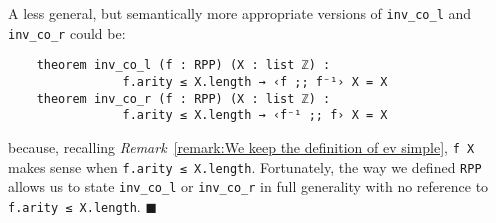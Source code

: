 \documentclass[runningheads]{llncs}
\newcommand*{\qeda}{\hfill\ensuremath{\blacksquare}}%
\begin{document}
\begin{remark}
\label{remark:On our simplifying choices on ev}
A less general, but semantically more appropriate versions of  \lstinline|inv_co_l| and \lstinline|inv_co_r| could be:
\begin{lstlisting}
    theorem inv_co_l (f : RPP) (X : list ℤ) :
                f.arity ≤ X.length → ‹f ;; f⁻¹› X = X
    theorem inv_co_r (f : RPP) (X : list ℤ) :
                f.arity ≤ X.length → ‹f⁻¹ ;; f› X = X
\end{lstlisting}
because, recalling \textit{Remark}~\ref{remark:We keep the definition of ev simple}, \lstinline|f X| makes sense when \lstinline|f.arity ≤ X.length|.
Fortunately, the way we defined \lstinline|RPP| allows us to state \lstinline|inv_co_l| or \lstinline|inv_co_r| in full generality
with no reference to \lstinline|f.arity ≤ X.length|.
\qeda
\end{remark}

\end{document}
